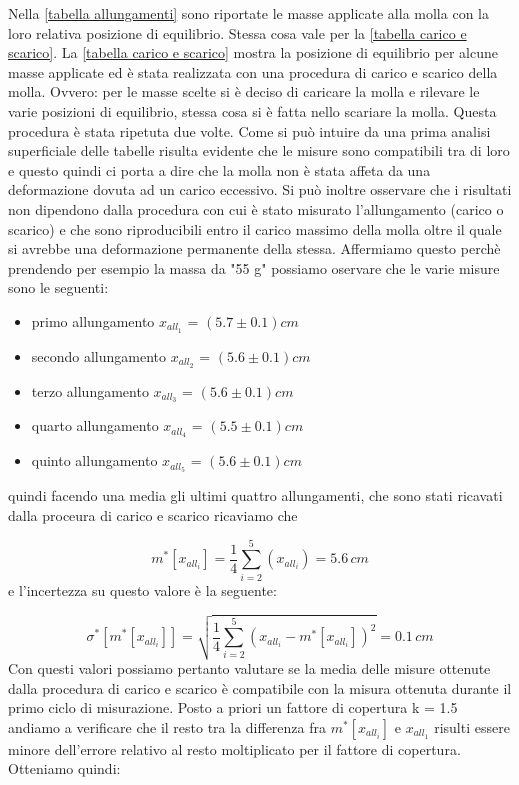Nella \ref{tabella allungamenti} sono riportate le masse applicate alla molla con la loro relativa posizione di equilibrio. Stessa cosa vale per la \ref{tabella carico e scarico}.
La \ref{tabella carico e scarico} mostra la posizione di equilibrio per alcune masse applicate ed è stata realizzata con una procedura di carico e scarico della molla. Ovvero: per le masse scelte si è deciso di caricare la molla e rilevare le varie posizioni di equilibrio, stessa cosa si è fatta nello scariare la molla. Questa procedura è stata ripetuta due volte.
Come si può intuire da una prima analisi superficiale delle tabelle risulta evidente che le misure sono compatibili tra di loro e questo quindi ci porta a dire che la molla non è stata affeta da una deformazione dovuta ad un carico eccessivo. Si può inoltre osservare che i risultati non dipendono dalla procedura con cui è stato misurato l'allungamento (carico o scarico) e che sono riproducibili entro il carico massimo della molla oltre il quale si avrebbe una deformazione permanente della stessa.
Affermiamo questo perchè prendendo per esempio la massa da "55 g" possiamo oservare che le varie misure sono le seguenti:
\begin{itemize}
	\item{primo allungamento $x_{all_1}$ = $(5.7 \pm 0.1) cm$}
	\item{secondo allungamento $x_{all_2}$ = $(5.6 \pm 0.1) cm$}
	\item{terzo allungamento $x_{all_3}$ = $(5.6 \pm 0.1) cm$}
	\item{quarto allungamento $x_{all_4}$ = $(5.5 \pm 0.1) cm$}
	\item{quinto allungamento $x_{all_5}$ = $(5.6 \pm 0.1) cm$}
\end{itemize}
quindi facendo una media gli ultimi quattro allungamenti, che sono stati ricavati dalla proceura di carico e scarico ricaviamo che

\begin{equation*}
	m^*[x_{all_i}] = \frac{1}{4} \sum_{i=2}^{5} (x_{all_i}) = 5.6\, cm
\end{equation*}
%
e l'incertezza su questo valore è la seguente:

\begin{equation*}
	\sigma^*[m^*[x_{all_i}]] = \sqrt{\frac{1}{4} \sum_{i=2}^{5} (x_{all_i} - m^*[x_{all_i}])^2} = 0.1\, cm
\end{equation*}
%
Con questi valori possiamo pertanto valutare se la media delle misure ottenute dalla procedura di carico e scarico è compatibile con la misura ottenuta durante il primo ciclo di misurazione. Posto a priori un fattore di copertura k = 1.5 andiamo a verificare che il resto tra la differenza fra $m^*[x_{all_i}]$ e $x_{all_1}$ risulti essere minore dell'errore relativo al resto moltiplicato per il fattore di copertura.
Otteniamo quindi:

